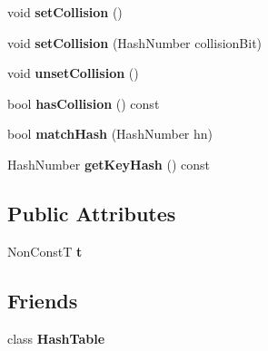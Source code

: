 \begin{DoxyCompactItemize}
\item 
\hypertarget{classjs_1_1detail_1_1_hash_table_entry_a66f9d51c6e8a951983d4b17aaaadb798}{void {\bfseries set\-Collision} ()}\label{classjs_1_1detail_1_1_hash_table_entry_a66f9d51c6e8a951983d4b17aaaadb798}

\item 
\hypertarget{classjs_1_1detail_1_1_hash_table_entry_a38bc7104e508a0040608f2ace438b0f2}{void {\bfseries set\-Collision} (Hash\-Number collision\-Bit)}\label{classjs_1_1detail_1_1_hash_table_entry_a38bc7104e508a0040608f2ace438b0f2}

\item 
\hypertarget{classjs_1_1detail_1_1_hash_table_entry_a128fe25d12f300349d08d17761ff61fa}{void {\bfseries unset\-Collision} ()}\label{classjs_1_1detail_1_1_hash_table_entry_a128fe25d12f300349d08d17761ff61fa}

\item 
\hypertarget{classjs_1_1detail_1_1_hash_table_entry_a4155a7c9f5bfcc5c3e2b29b24ecdda91}{bool {\bfseries has\-Collision} () const }\label{classjs_1_1detail_1_1_hash_table_entry_a4155a7c9f5bfcc5c3e2b29b24ecdda91}

\item 
\hypertarget{classjs_1_1detail_1_1_hash_table_entry_a1c47be88d106b8c46d779c8f87301539}{bool {\bfseries match\-Hash} (Hash\-Number hn)}\label{classjs_1_1detail_1_1_hash_table_entry_a1c47be88d106b8c46d779c8f87301539}

\item 
\hypertarget{classjs_1_1detail_1_1_hash_table_entry_af34312f934bed43151ece3a1f3b90d08}{Hash\-Number {\bfseries get\-Key\-Hash} () const }\label{classjs_1_1detail_1_1_hash_table_entry_af34312f934bed43151ece3a1f3b90d08}

\end{DoxyCompactItemize}
\subsection*{Public Attributes}
\begin{DoxyCompactItemize}
\item 
\hypertarget{classjs_1_1detail_1_1_hash_table_entry_a3417767c7c8b446cc2fa979d280b0320}{Non\-Const\-T {\bfseries t}}\label{classjs_1_1detail_1_1_hash_table_entry_a3417767c7c8b446cc2fa979d280b0320}

\end{DoxyCompactItemize}
\subsection*{Friends}
\begin{DoxyCompactItemize}
\item 
\hypertarget{classjs_1_1detail_1_1_hash_table_entry_a0d65cc1d3f862388016ca21139b4659a}{class {\bfseries Hash\-Table}}\label{classjs_1_1detail_1_1_hash_table_entry_a0d65cc1d3f862388016ca21139b4659a}

\end{DoxyCompactItemize}

